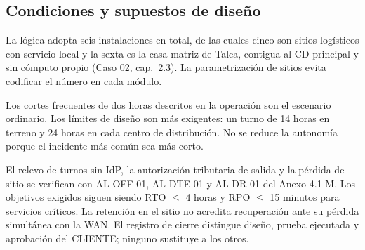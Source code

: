 \subsection{Condiciones y supuestos de diseño}
\label{sec:contradicciones}

La lógica adopta seis instalaciones en total, de las cuales cinco son sitios logísticos con servicio local y la sexta es la casa matriz de Talca, contigua al CD principal y sin cómputo propio (Caso 02, cap.~2.3). La parametrización de sitios evita codificar el número en cada módulo.

Los cortes frecuentes de dos horas descritos en la operación son el escenario ordinario. Los límites de diseño son más exigentes: un turno de 14 horas en terreno y 24 horas en cada centro de distribución. No se reduce la autonomía porque el incidente más común sea más corto.

El relevo de turnos sin IdP, la autorización tributaria de salida y la pérdida de sitio se verifican con AL-OFF-01, AL-DTE-01 y AL-DR-01 del Anexo 4.1-M. Los objetivos exigidos siguen siendo RTO $\leq$ 4 horas y RPO $\leq$ 15 minutos para servicios críticos. La retención en el sitio no acredita recuperación ante su pérdida simultánea con la WAN. El registro de cierre distingue diseño, prueba ejecutada y aprobación del CLIENTE; ninguno sustituye a los otros.

\clearpage

